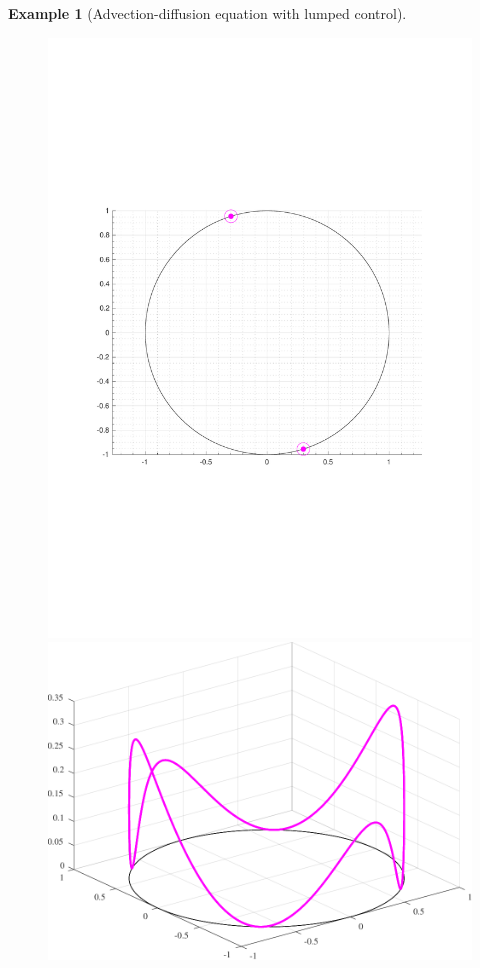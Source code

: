 \documentclass[journal,twoside,web]{ieeecolor}
\newtheorem{example}{Example}
\begin{document}
\begin{example}[Advection-diffusion equation with lumped control]
\begin{figure}
	\includegraphics[scale=0.265]{figures/convect-+_opt}
	\hspace{0.1cm}
	\includegraphics[scale=0.265]{figures/convection_+-}

\end{figure}
\end{example}
\end{document}

